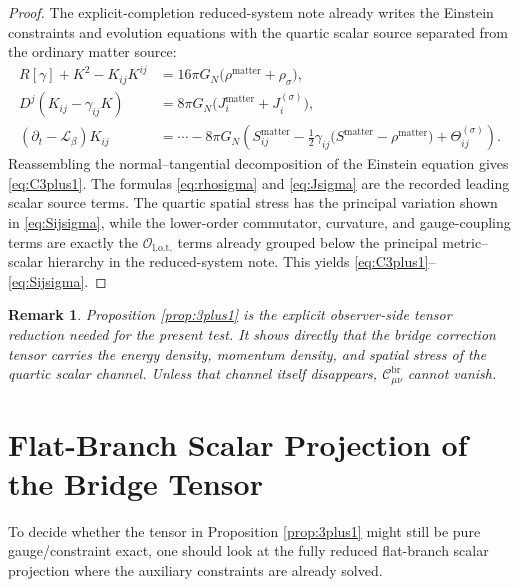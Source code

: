 \documentclass[11pt]{article}
\newcommand{\Ell}{\mathcal{L}}
\newtheorem{remark}{Remark}
\begin{document}
\begin{proof}
The explicit-completion reduced-system note already writes the Einstein constraints and evolution equations with the quartic scalar source separated from the ordinary matter source:
\begin{align*}
R[\gamma]+K^2-K_{ij}K^{ij}
&=
16\pi G_N\bigl(\rho^{\mathrm{matter}}+\rho_\sigma\bigr),
\\
D^j(K_{ij}-\gamma_{ij}K)
&=
8\pi G_N\bigl(J_i^{\mathrm{matter}}+J_i^{(\sigma)}\bigr),
\\
(\partial_t-\Ell_\beta)K_{ij}
&=
\cdots
-8\pi G_N
\left(
S_{ij}^{\mathrm{matter}}
-\frac{1}{2}\gamma_{ij}\bigl(S^{\mathrm{matter}}-\rho^{\mathrm{matter}}\bigr)
+\Theta_{ij}^{(\sigma)}
\right).
\end{align*}
Reassembling the normal--tangential decomposition of the Einstein equation gives \eqref{eq:C3plus1}. The formulas \eqref{eq:rhosigma} and \eqref{eq:Jsigma} are the recorded leading scalar source terms. The quartic spatial stress has the principal variation shown in \eqref{eq:Sijsigma}, while the lower-order commutator, curvature, and gauge-coupling terms are exactly the \(\mathcal O_{\mathrm{l.o.t.}}\) terms already grouped below the principal metric--scalar hierarchy in the reduced-system note. This yields \eqref{eq:C3plus1}--\eqref{eq:Sijsigma}.
\end{proof}

\begin{remark}
Proposition \ref{prop:3plus1} is the explicit observer-side tensor reduction needed for the present test. It shows directly that the bridge correction tensor carries the energy density, momentum density, and spatial stress of the quartic scalar channel. Unless that channel itself disappears, \(\mathcal C_{\mu\nu}^{\mathrm{br}}\) cannot vanish.
\end{remark}

\section{Flat-Branch Scalar Projection of the Bridge Tensor}

To decide whether the tensor in Proposition \ref{prop:3plus1} might still be pure gauge/constraint exact, one should look at the fully reduced flat-branch scalar projection where the auxiliary constraints are already solved.
\end{document}
